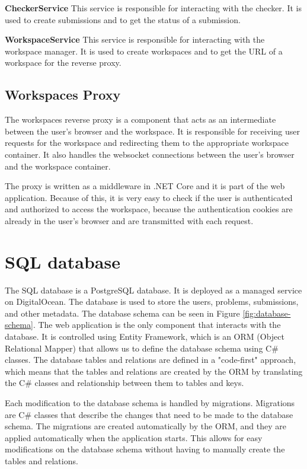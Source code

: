 \documentclass[12pt,a4paper]{report}
\begin{document}
\textbf{CheckerService}
This service is responsible for interacting with the checker. It is used to create submissions and to get the status of a submission.

\textbf{WorkspaceService}
This service is responsible for interacting with the workspace manager. It is used to create workspaces and to get the URL of a workspace for the reverse proxy.

\subsection{Workspaces Proxy} \label{workspaces-proxy}
The workspaces reverse proxy is a component that acts as an intermediate between the user's browser and the workspace. It is responsible for receiving user requests for the workspace and redirecting them to the appropriate workspace container. It also handles the websocket connections between the user's browser and the workspace container.

The proxy is written as a middleware in .NET Core and it is part of the web application. Because of this, it is very easy to check if the user is authenticated and authorized to access the workspace, because the authentication cookies are already in the user's browser and are transmitted with each request. 

\section{SQL database}
The SQL database is a PostgreSQL database. It is deployed as a managed service on DigitalOcean. The database is used to store the users, problems, submissions, and other metadata. The database schema can be seen in Figure \ref{fig:database-schema}. The web application is the only component that interacts with the database. It is controlled using Entity Framework, which is an ORM (Object Relational Mapper) that allows us to define the database schema using C\# classes. The database tables and relations are defined in a "code-first" approach, which means that the tables and relations are created by the ORM by translating the C\# classes and relationship between them to tables and keys.

Each modification to the database schema is handled by migrations. Migrations are C\# classes that describe the changes that need to be made to the database schema. The migrations are created automatically by the ORM, and they are applied automatically when the application starts. This allows for easy modifications on the database schema without having to manually create the tables and relations.
\end{document}
